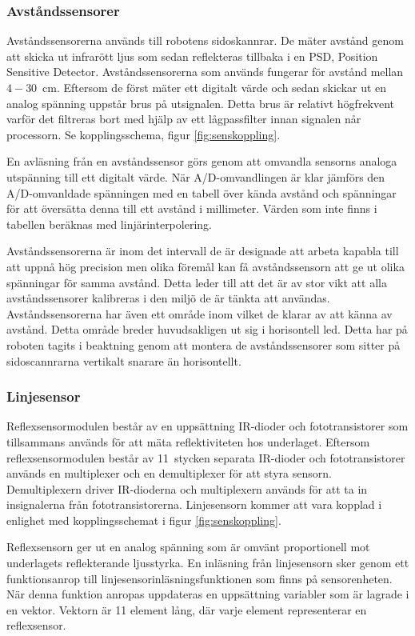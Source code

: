\subsubsection{Avståndssensorer}
Avståndssensorerna används till robotens sidoskannrar. De mäter avstånd genom att skicka ut infrarött ljus som sedan reflekteras tillbaka i en PSD, Position Sensitive Detector. Avståndssensorerna som används fungerar för avstånd mellan \mbox{$4-30$ cm}. Eftersom de först mäter ett digitalt värde och sedan skickar ut en analog spänning uppstår brus på utsignalen. Detta brus är relativt högfrekvent varför det filtreras bort med hjälp av ett lågpassfilter innan signalen når processorn. Se kopplingsschema, figur \ref{fig:senskoppling}.

En avläsning från en avståndssensor görs genom att omvandla sensorns analoga utspänning till ett digitalt värde. När A/D-omvandlingen är klar jämförs den A/D-omvanldade spänningen med en tabell över kända avstånd och spänningar för att översätta denna till ett avstånd i millimeter. Värden som inte finns i tabellen beräknas med linjärinterpolering. 

Avståndssensorerna är inom det intervall de är designade att arbeta kapabla till att uppnå hög precision men olika föremål kan få avståndssensorn att ge ut olika spänningar för samma avstånd. Detta leder till att det är av stor vikt att alla avståndssensorer kalibreras i den miljö de är tänkta att användas. Avståndssensorerna har även ett område inom vilket de klarar av att känna av avstånd. Detta område breder huvudsakligen ut sig i horisontell led. Detta har på roboten tagits i beaktning genom att montera de avståndssensorer som sitter på sidoscannrarna vertikalt snarare än horisontellt.

\subsubsection{Linjesensor}
Reflexsensormodulen består av en uppsättning IR-dioder och fototransistorer som tillsammans används för att mäta reflektiviteten hos underlaget. Eftersom reflexsensormodulen består av 11~stycken separata IR-dioder och fototransistorer används en multiplexer och en demultiplexer för att styra sensorn. Demultiplexern driver IR-dioderna och multiplexern används för att ta in insignalerna från fototransistorerna. Linjesensorn kommer att vara kopplad i enlighet med kopplingsschemat i figur \ref{fig:senskoppling}.

Reflexsensorn ger ut en analog spänning som är omvänt proportionell mot underlagets reflekterande ljusstyrka. En inläsning från linjesensorn sker genom ett funktionsanrop till linjesensorinläsningsfunktionen som finns på sensorenheten. När denna funktion anropas uppdateras en uppsättning variabler som är lagrade i en vektor. Vektorn är 11 element lång, där varje element representerar en reflexsensor.


